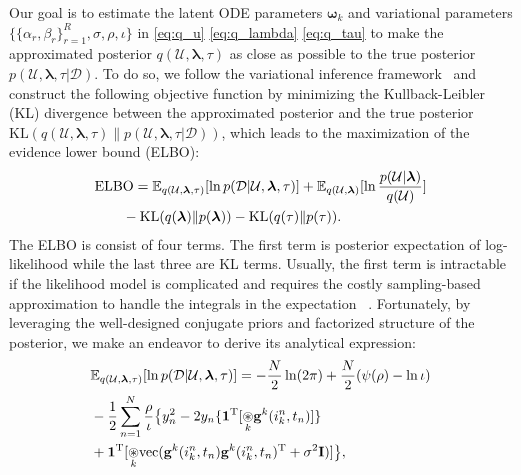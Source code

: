 Our goal is to estimate the latent ODE parameters $\boldsymbol{\omega}_k$ and variational parameters $\{ \{\alpha_r, \beta_r\}_{r=1}^{R}, \sigma, \rho, \iota \}$ in \eqref{eq:q_u} \eqref{eq:q_lambda} \eqref{eq:q_tau} to make the approximated posterior $q(\mathcal{U}, \boldsymbol{\lambda}, \tau)$ as close as possible to the true posterior $p(\mathcal{U}, \boldsymbol{\lambda}, \tau|\mathcal{D})$. To do so, we follow the variational inference framework~\citep{variational_inference} and construct the following objective function by minimizing the Kullback-Leibler (KL) divergence between the approximated posterior and the true posterior $\text{KL}(q(\mathcal{U}, \boldsymbol{\lambda}, \tau)\|p(\mathcal{U}, \boldsymbol{\lambda}, \tau|\mathcal{D}))$, which  leads to the maximization of the evidence lower bound (ELBO): 
\vspace{-2mm}
\begin{align}
        &\text{ELBO} = \mathbb{E}_{q(\mathcal{U}, \boldsymbol{\lambda}, \tau)}[\ln p(\mathcal{D}|\mathcal{U}, \boldsymbol{\lambda}, \tau)] +\mathbb{E}_{q(\mathcal{U}, \boldsymbol{\lambda})}[\ln 
        \frac{p(\mathcal{U}|\boldsymbol{\lambda})}{q(\mathcal{U})}] \nonumber \\
        &\qquad - \text{KL}(q(\boldsymbol{\lambda})\|p(\boldsymbol{\lambda})) - \text{KL}(q(\tau)\|p(\tau)) \label{eq:elbo}.
\end{align}
The ELBO is consist of four terms. The first term is posterior expectation of log-likelihood  while the last three are KL terms. Usually, the first term is intractable if the likelihood model is complicated and requires the costly  sampling-based approximation to handle the integrals in the expectation ~\citep{doersch2016tutorialVAE, NONFAT}. Fortunately, by leveraging the well-designed conjugate priors and factorized structure of the posterior, we make an endeavor to derive its analytical expression:
\vspace{-2mm}
\begin{align}
        &\mathbb{E}_{q(\mathcal{U}, \boldsymbol{\lambda}, \tau)}[\ln p(\mathcal{D}|\mathcal{U}, \boldsymbol{\lambda}, \tau)] =-\frac{N}{2}\ln(2\pi) + \frac{N}{2}(\psi(\rho)-\ln\iota) \nonumber\\
        &-\frac{1}{2}\sum_{n=1}^{N}\frac{\rho}{\iota}\big\{ y_n^2 -2y_n\{\boldsymbol{1}^{\mathrm{T}}[\underset{k}{\circledast} \mathbf{g}^k(i_k^n,t_n)]\}\nonumber \\
&  +\boldsymbol{1}^{\mathrm{T}}[\underset{k}{\circledast} \text{vec}(\mathbf{g}^{k}(i_k^{n},t_n)\mathbf{g}^{k}(i_k^{n},t_n)^{\mathrm{T}}+\sigma^2\mathbf{I})]\big\},\label{term1}
\end{align}
